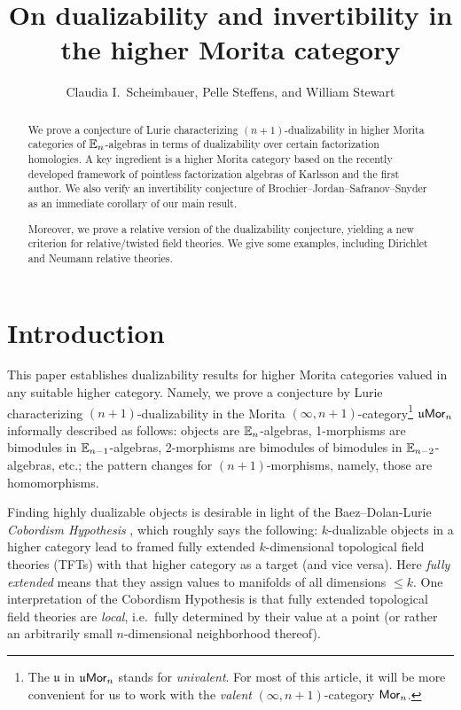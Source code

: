 \documentclass[10pt, reqno, twoside
, final
]{amsart}
\title{On dualizability and invertibility in the higher Morita category}
\author[Scheimbauer, Steffens, and Stewart]{Claudia I.~Scheimbauer, Pelle Steffens, and William Stewart}
\date{}
\numberwithin{equation}{subsection}%
\theoremstyle{definition}
\theoremstyle{definition}
\theoremstyle{definition}
\theoremstyle{definition}
\theoremstyle{definition}
\theoremstyle{definition}
\theoremstyle{definition}
\theoremstyle{definition}
\theoremstyle{definition}
\theoremstyle{plain}
\theoremstyle{definition}
\theoremstyle{plain}
\theoremstyle{definition}
\theoremstyle{plain}
\theoremstyle{definition}
\theoremstyle{definition}
\theoremstyle{plain}
\theoremstyle{plain}
\theoremstyle{definition}
\theoremstyle{plain}
\theoremstyle{plain}
\theoremstyle{plain}
\begin{document}
\setcounter{tocdepth}{2}
\setcounter{page}{1}

\begin{abstract}
 We prove a conjecture of Lurie characterizing $(n+1)$-dualizability in higher Morita categories of $\mathbb{E}_n$-algebras in terms of dualizability over certain factorization homologies.
 A key ingredient is a higher Morita category based on the recently developed framework of pointless factorization algebras of Karlsson and the first author.
We also verify an invertibility conjecture of Brochier--Jordan--Safranov--Snyder as an immediate corollary of our main result.

Moreover, we prove a relative version of the dualizability conjecture, yielding a new criterion for relative/twisted field theories.
We give some examples, including Dirichlet and Neumann relative theories.
\end{abstract}


\maketitle
\thispagestyle{titlefooter}

\tableofcontents


\section{Introduction}

This paper establishes dualizability results for higher Morita categories valued in any suitable higher category.
Namely, we prove a conjecture by Lurie \cite[Remark 4.1.27]{LurieCobordism} characterizing $(n+1)$-dualizability in the Morita
$(\infty, n+1)$-category\footnote{The $\mathfrak{u}$ in $\mathfrak{u}\mathsf{Mor}_n$ stands for \emph{univalent}. For most of this article, it will be more convenient for us to work with the \emph{valent} $(\infty,n+1)$-category $\mathsf{Mor}_n$.} $\mathfrak{u}\mathsf{Mor}_n$ informally described as follows: objects are $\mathbb{E}_n$-algebras, 1-morphisms are bimodules in $\mathbb{E}_{n-1}$-algebras, 2-morphisms are bimodules of bimodules in $\mathbb{E}_{n-2}$-algebras, etc.; the pattern changes for $(n+1)$-morphisms, namely, those are homomorphisms.


Finding highly dualizable objects is desirable in light of the Baez--Dolan-Lurie {\em Cobordism Hypothesis} \cite{BaezDolan, LurieCobordism}, which roughly says the following:  $k$-dualizable objects in a higher category lead to framed fully extended $k$-dimensional topological field theories (TFTs) with that higher category as a target (and vice versa).
Here {\em fully extended} means that they assign values to manifolds of all dimensions $\leq k$.
One interpretation of the Cobordism Hypothesis is that fully extended topological field theories are {\em local}, i.e.~fully determined by their value at a point (or rather an arbitrarily  small $n$-dimensional neighborhood thereof).
\end{document}
